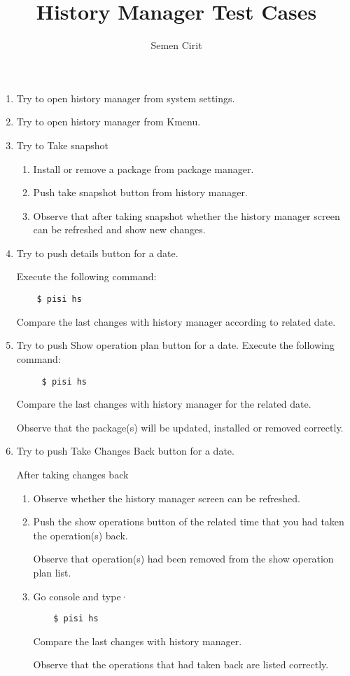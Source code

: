 \documentclass[a4paper,10pt]{article}
\title{History Manager Test Cases}
\author{Semen Cirit}
\begin{document}
\maketitle

\begin{enumerate}
\item Try to open history manager from system settings.
\item Try to open history manager from Kmenu.
\item Try to Take snapshot	
\begin{enumerate}
    \item Install or remove a package from package manager.
    \item Push take snapshot button from history manager.
    \item Observe that after taking snapshot whether the history manager screen can be refreshed and show new changes.
\end{enumerate}

\item Try to push details button for a date.

    Execute the following command:
\begin{verbatim}
    $ pisi hs
\end{verbatim} 

    Compare the last changes with history manager according to related date. 

\item Try to push Show operation plan button for a date.
    Execute the following command:
\begin{verbatim}
     $ pisi hs
\end{verbatim} 
    Compare the last changes with history manager for the related date.

    Observe that the package(s) will be updated, installed or removed correctly.

\item Try to push Take Changes Back button for a date.

        After taking changes back 
\begin{enumerate}
        \item Observe whether the history manager screen can be refreshed.
        \item Push the show operations button of the related time that you had taken the operation(s) back.

              Observe that operation(s) had been removed from the show operation plan list.
     	\item Go console and type·
\begin{verbatim}
    $ pisi hs
\end{verbatim} 

            Compare the last changes with history manager.

            Observe that the operations that had taken back are listed correctly.
\end{enumerate}
\end{enumerate}
\end{document}
